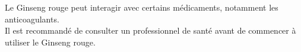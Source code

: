 \begin{Remarque}
    Le Ginseng rouge peut interagir avec certains médicaments, notamment les anticoagulants. \\
    Il est recommandé de consulter un professionnel de santé avant de commencer à utiliser le Ginseng rouge.
\end{Remarque}